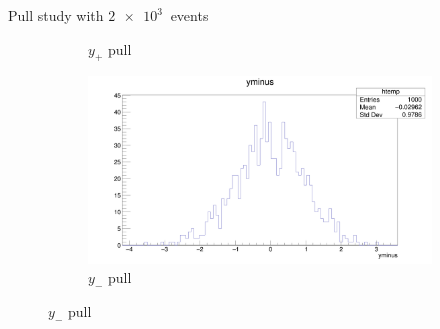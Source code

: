 \documentclass{beamer}
\begin{document}
\begin{frame}{Pull study with $\SI{2e3}{}$ events}
\begin{figure}
\begin{subfigure}{0.5\textwidth}
      \caption{$y_+$ pull}
    \end{subfigure}%
    \begin{subfigure}{0.5\textwidth}
      \includegraphics[width = 1.0\textwidth]{SophisticatedPulls/yminus1K1K.png}
      \caption{$y_-$ pull}
    \end{subfigure}
  \end{figure}
\end{frame}
\end{document}

